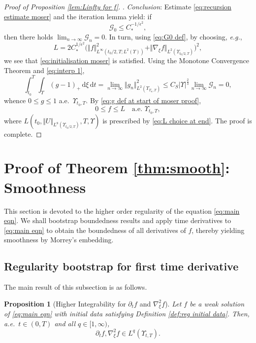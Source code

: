\documentclass[11pt,a4paper,reqno]{amsart}
\newtheorem{prop}{Proposition}[section]
\theoremstyle{remark}
\theoremstyle{definition}
\numberwithin{equation}{section}
\newcommand{\bxi}{\xi}
\renewcommand{\d}{\, \mathrm{d} }
\begin{document}
\begin{proof}[Proof of Proposition \ref{lem:Linfty for f}]
\smallskip 

. \textit{Conclusion}: Estimate \eqref{eq:recursion estimate moser} and the iteration lemma \cite[\S 1, Lemma 4.1]{DiBenedetto} yield: if 
\begin{equation}\label{eq:initialisation moser}
    \mathscr{G}_0 \leq C_*^{-1/\epsilon^2}, 
\end{equation}
then there holds $\lim_{n\to\infty}\mathscr{G}_n = 0$. In turn, using \eqref{eq:G0 def}, by choosing, \textit{e.g.}, 
\begin{equation}\label{eq:L choice at end}
    L = 2 C_*^{1/\epsilon^2} \Big(\Vert f \Vert_{L^\infty(t_0/2,T;L^2(\Upsilon))}^2 + \Vert \nabla_{\bxi} f \Vert_{L^2(\Upsilon_{t_0/2,T})} \Big)^2, 
\end{equation}
we see that \eqref{eq:initialisation moser} is satisfied. Using the Monotone Convergence Theorem and \eqref{eq:interp 1}, 
\begin{equation*}
    \int_{t_0}^T \int_\Upsilon (g-1)_+ \d \bxi \d t = \lim_{n\to\infty} \Vert g_n \Vert^2_{L^2(\Upsilon_{T_n,T})} \leq C_S |\Upsilon|^{\frac{2}{3}} \lim_{n\to\infty}\mathscr{G}_n = 0, 
\end{equation*}
whence $0 \leq g \leq 1$ a.e.~$\Upsilon_{t_0,T}$. By \eqref{eq:g def at start of moser proof}, $$0 \leq f \leq L \quad \text{a.e.~}\Upsilon_{t_0,T},$$ where $L(t_0,\Vert U \Vert_{L^8(\Upsilon_{t_0/2,T})} , T , \Upsilon)$ is prescribed by \eqref{eq:L choice at end}. The proof is complete. 
\end{proof}


\section{Proof of Theorem \ref{thm:smooth}: Smoothness}\label{sec:higher reg}

This section is devoted to the higher order regularity of the equation \eqref{eq:main eqn}. We shall bootstrap boundedness results and apply time derivatives to \eqref{eq:main eqn} to obtain the boundedness of all derivatives of $f$, thereby yielding smoothness by Morrey's embedding. 

\subsection{Regularity bootstrap for first time derivative}
The main result of this subsection is as follows. 


\begin{prop}[Higher Integrability for $\partial_t f$ and $\nabla_{\bxi}^2 f$]\label{lem:all space derivs}
   Let $f$ be a weak solution of \eqref{eq:main eqn} with initial data satisfying Definition \ref{def:reg initial data}. Then, a.e.~$t \in (0,T)$ and all $q \in [1,\infty)$,  $$\partial_t f, \nabla_{\bxi}^2 f \in L^q(\Upsilon_{t,T}).$$ 
\end{prop}
\end{document}
